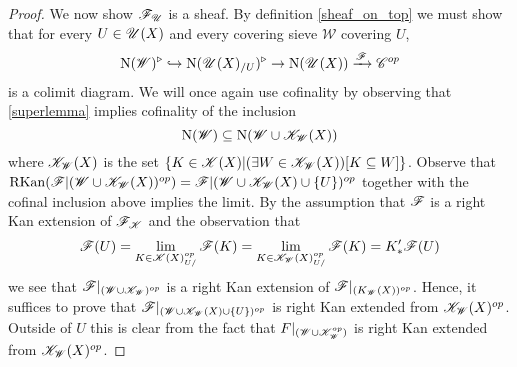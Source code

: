 \documentclass[../thesis.tex]{subfiles}
\begin{document}
\begin{proof}
    We now show $\mathscr{F}_{\mathscr{U}}$ is a sheaf.
    By definition \ref{sheaf_on_top} we must show that for every $U\in \mathscr{U}(X)$ and every covering sieve $\mathscr{W}$ covering $U$,
    \[
        \mathrm{N}(\mathscr{W})^{\triangleright} \hookrightarrow \mathrm{N}(\mathscr{U}(X)_{/U})^{\triangleright} \rightarrow \mathrm{N}(\mathscr{U}(X))\xrightarrow{\mathscr{F}}\mathscr{C}^{op}
    \]
    is a colimit diagram.
    We will once again use cofinality by observing that \ref{superlemma} implies cofinality of the inclusion
    \[
        \mathrm{N}(\mathscr{W}) \subseteq \mathrm{N}(\mathscr{W} \cup \mathscr{K}_{\mathscr{W}}(X))
    \]
    where $\mathscr{K}_{\mathscr{W}}(X)$ is the set $\{K\in \mathscr{K}(X) | (\exists W \in \mathscr{K}_{\mathscr{W}}(X))[K \subseteq W] \}$.
    Observe that $\mathrm{RKan}(\mathscr{F}|(\mathscr{W} \cup \mathscr{K}_{\mathscr{W}}(X))^{op}) = \mathscr{F}|(\mathscr{W} \cup \mathscr{K}_{\mathscr{W}}(X) \cup \{U\})^{op}$ together with the cofinal inclusion above implies the limit.
    By the assumption that $\mathscr{F}$ is a right Kan extension of $\mathscr{F}_{\mathscr{K}}$ and the observation that
    \[
        \mathscr{F}(U) = \lim_{K\in \mathscr{K}(X)^{op}_{U/}}\mathscr{F}(K) = \lim_{K\in \mathscr{K}_{\mathscr{W}}(X)^{op}_{U/}}\mathscr{F}(K) = K_*^{\prime}\mathscr{F}(U)
    \]
    we see that $\mathscr{F}|_{(\mathscr{W} \cup \mathscr{K}_{\mathscr{W}})^{op}}$ is a right Kan extension of $\mathscr{F}|_{(K_{\mathscr{W}}(X))^{op}}$.
    Hence, it suffices to prove that $\mathscr{F}|_{(\mathscr{W} \cup \mathscr{K}_{\mathscr{W}}(X)\cup \{U\})^{op}}$ is right Kan extended from $\mathscr{K}_{\mathscr{W}}(X)^{op}$.
    Outside of $U$ this is clear from the fact that $F|_{(\mathscr{W} \cup \mathscr{K}_{\mathscr{W}}^{op})}$ is right Kan extended from $\mathscr{K}_{\mathscr{W}}(X)^{op}$.

\end{proof}
\end{document}
